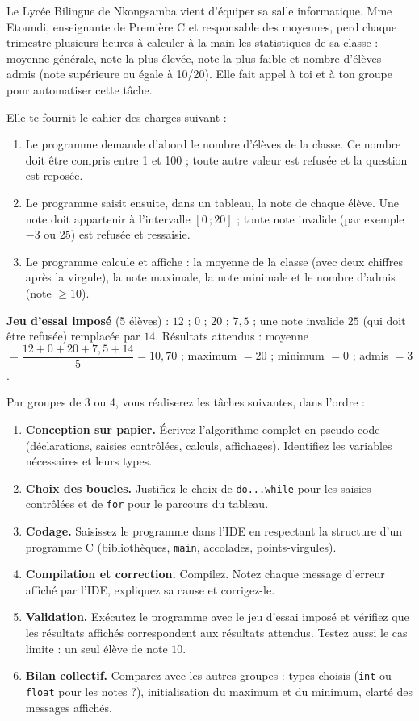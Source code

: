 \documentclass[11pt]{article}
\newcommand{\cle}[1]{{\popxbold\color{popdark}#1}}
\newcounter{popsec}
\newcounter{popsub}
\newcommand{\courssub}[1]{%
  \stepcounter{popsub}%
  \par\vspace{9pt}\noindent{\popxbold\fontsize{11.5}{13}\selectfont\color{popink}{\color{poporange}\thepopsec.\thepopsub}\hspace{6pt}#1}\par\nopagebreak\vspace{4pt}
}
\begin{document}
\courssub{Situation}

Le Lycée Bilingue de Nkongsamba vient d'équiper sa salle informatique. Mme Etoundi, enseignante de Première C et responsable des moyennes, perd chaque trimestre plusieurs heures à calculer à la main les statistiques de sa classe : moyenne générale, note la plus élevée, note la plus faible et nombre d'élèves admis (note supérieure ou égale à 10/20). Elle fait appel à toi et à ton groupe pour automatiser cette tâche.

Elle te fournit le cahier des charges suivant :

\begin{enumerate}
\item Le programme demande d'abord le \cle{nombre d'élèves} de la classe. Ce nombre doit être compris entre 1 et 100 ; toute autre valeur est refusée et la question est reposée.
\item Le programme saisit ensuite, dans un \cle{tableau}, la note de chaque élève. Une note doit appartenir à l'intervalle $[0\,;20]$ ; toute note invalide (par exemple $-3$ ou $25$) est refusée et ressaisie.
\item Le programme calcule et affiche : la \cle{moyenne} de la classe (avec deux chiffres après la virgule), la \cle{note maximale}, la \cle{note minimale} et le \cle{nombre d'admis} (note $\geq 10$).
\end{enumerate}

\textbf{Jeu d'essai imposé} (5 élèves) : $12$ ; $0$ ; $20$ ; $7{,}5$ ; une note invalide $25$ (qui doit être refusée) remplacée par $14$. Résultats attendus : moyenne $= \dfrac{12+0+20+7{,}5+14}{5} = 10{,}70$ ; maximum $= 20$ ; minimum $= 0$ ; admis $= 3$.

\courssub{Consignes}

Par groupes de 3 ou 4, vous réaliserez les tâches suivantes, dans l'ordre :

\begin{enumerate}
\item \textbf{Conception sur papier.} Écrivez l'algorithme complet en pseudo-code (déclarations, saisies contrôlées, calculs, affichages). Identifiez les variables nécessaires et leurs types.
\item \textbf{Choix des boucles.} Justifiez le choix de \texttt{do...while} pour les saisies contrôlées et de \texttt{for} pour le parcours du tableau.
\item \textbf{Codage.} Saisissez le programme dans l'IDE en respectant la structure d'un programme C (bibliothèques, \texttt{main}, accolades, points-virgules).
\item \textbf{Compilation et correction.} Compilez. Notez chaque message d'erreur affiché par l'IDE, expliquez sa cause et corrigez-le.
\item \textbf{Validation.} Exécutez le programme avec le jeu d'essai imposé et vérifiez que les résultats affichés correspondent aux résultats attendus. Testez aussi le cas limite : un seul élève de note $10$.
\item \textbf{Bilan collectif.} Comparez avec les autres groupes : types choisis (\texttt{int} ou \texttt{float} pour les notes ?), initialisation du maximum et du minimum, clarté des messages affichés.
\end{enumerate}
\end{document}
